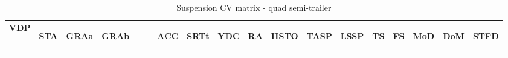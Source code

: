 \begin{table}[H]
\centering\scriptsize
\caption{Suspension CV matrix - quad semi-trailer}   
\label{table:suspension-cv-quad-semi}
\begin{tabular}{|l|c|c|c|c|c|c|c|c|c|c|c|c|c|c|c|}

\hline
\multicolumn{1}{|c|}{\textbf{VDP}} & \begin{sideways}\textbf{STA}\end{sideways} & \begin{sideways}\textbf{GRAa}\end{sideways} & \begin{sideways}\textbf{GRAb~~~~}\end{sideways} & \begin{sideways}\textbf{ACC}\end{sideways} & \begin{sideways}\textbf{SRTt}\end{sideways} & \begin{sideways}\textbf{YDC}\end{sideways} & \begin{sideways}\textbf{RA}\end{sideways} & \begin{sideways}\textbf{HSTO}\end{sideways} & \begin{sideways}\textbf{TASP}\end{sideways} & \begin{sideways}\textbf{LSSP}\end{sideways} & \begin{sideways}\textbf{TS}\end{sideways} & \begin{sideways}\textbf{FS}\end{sideways} & \begin{sideways}\textbf{MoD}\end{sideways} & \begin{sideways}\textbf{DoM}\end{sideways} & \begin{sideways}\textbf{STFD}\end{sideways} \bigstrut \\


\end{tabular}
\end{table}
